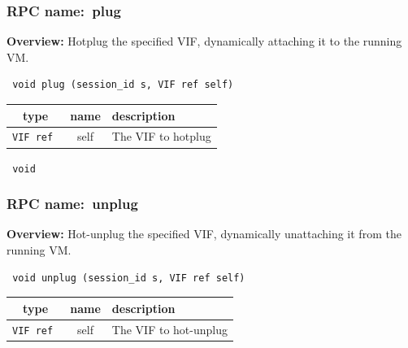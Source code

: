 \subsubsection{RPC name:~plug}

{\bf Overview:} 
Hotplug the specified VIF, dynamically attaching it to the running VM.

\begin{verbatim} void plug (session_id s, VIF ref self)\end{verbatim}



 
\vspace{0.3cm}
\begin{tabular}{|c|c|p{7cm}|}
 \hline
{\bf type} & {\bf name} & {\bf description} \\ \hline
{\tt VIF ref } & self & The VIF to hotplug \\ \hline 

\end{tabular}

\vspace{0.3cm}

{\tt 
void
}



\vspace{0.3cm}
\vspace{0.3cm}
\vspace{0.3cm}
\subsubsection{RPC name:~unplug}

{\bf Overview:} 
Hot-unplug the specified VIF, dynamically unattaching it from the running
VM.

\begin{verbatim} void unplug (session_id s, VIF ref self)\end{verbatim}



 
\vspace{0.3cm}
\begin{tabular}{|c|c|p{7cm}|}
 \hline
{\bf type} & {\bf name} & {\bf description} \\ \hline
{\tt VIF ref } & self & The VIF to hot-unplug \\ \hline 

\end{tabular}


